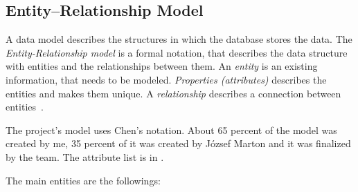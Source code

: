  \newpage
\subsection{Entity–Relationship Model}
\label{ER-model}

A data model describes the structures in which the database stores the data. The \emph{Entity-Relationship model} is a formal notation, that describes the data structure with entities and the relationships between them. An \emph{entity} is an existing information, that needs to be modeled. \emph{Properties (attributes)} describes the entities and makes them unique. A \emph{relationship} describes a connection between entities~\cite{adatb}.
 
The project's model uses Chen's notation. About 65 percent of the model was created by me, 35 percent of it was created by József Marton and it was finalized by the team. The attribute list is in .

 The main entities are the followings:

